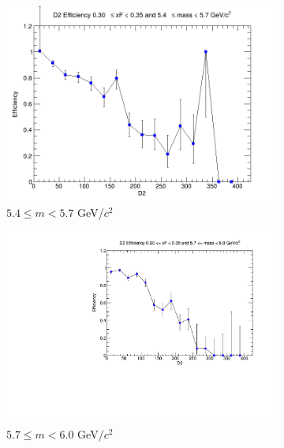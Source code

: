 \documentclass[11pt]{article}
\begin{document}
\begin{figure}[p]
\begin{subfigure}[b]{0.32\textwidth}
        \includegraphics[width=\textwidth]{./kTrackerEfficiencyPlots/D2_Efficiency_xF6_mass4.png}
        \caption{$5.4 \leq m < 5.7$ GeV/$c^2$}
    \end{subfigure}\hfill
    \begin{subfigure}[b]{0.32\textwidth}
        \centering
        \includegraphics[width=\textwidth]{./kTrackerEfficiencyPlots/D2_Efficiency_xF6_mass5.pdf}
        \caption{$5.7 \leq m < 6.0$ GeV/$c^2$}
    \end{subfigure}\vspace{0.5cm}
    \begin{subfigure}[b]{0.32\textwidth}
        \centering

\end{subfigure}
\end{figure}
\end{document}
